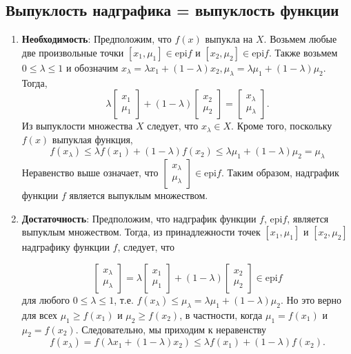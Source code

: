 \documentclass[
  russian,
  letterpaper,
  DIV=11,
  numbers=noendperiod]{scrartcl}
\begin{document}
\subsection{Выпуклость надграфика = выпуклость
функции}\label{ux432ux44bux43fux443ux43aux43bux43eux441ux442ux44c-ux43dux430ux434ux433ux440ux430ux444ux438ux43aux430-ux432ux44bux43fux443ux43aux43bux43eux441ux442ux44c-ux444ux443ux43dux43aux446ux438ux438-1}

\begin{enumerate}
\def\labelenumi{\arabic{enumi}.}
\item
  \textbf{Необходимость}: Предположим, что \(f(x)\) выпукла на \(X\).
  Возьмем любые две произвольные точки \([x_1, \mu_1] \in \text{epi}f\)
  и \([x_2, \mu_2] \in \text{epi}f\). Также возьмем
  \(0 \leq \lambda \leq 1\) и обозначим
  \(x_{\lambda} = \lambda x_1 + (1 - \lambda) x_2, \mu_{\lambda} = \lambda \mu_1 + (1 - \lambda) \mu_2\).
  Тогда, \[
  \lambda\begin{bmatrix}x_1\\ \mu_1\end{bmatrix} + (1 - \lambda)\begin{bmatrix}x_2\\ \mu_2\end{bmatrix} = \begin{bmatrix}x_{\lambda}\\ \mu_{\lambda}\end{bmatrix}.
  \] Из выпуклости множества \(X\) следует, что \(x_{\lambda} \in X\).
  Кроме того, поскольку \(f(x)\) выпуклая функция, \[
  f(x_{\lambda}) \leq \lambda f(x_1) + (1 - \lambda) f(x_2) \leq \lambda \mu_1 + (1 - \lambda) \mu_2 = \mu_{\lambda}
  \] Неравенство выше означает, что
  \(\begin{bmatrix}x_{\lambda}\\ \mu_{\lambda}\end{bmatrix} \in \text{epi}f\).
  Таким образом, надграфик функции \(f\) является выпуклым множеством.
\item
  \textbf{Достаточность}: Предположим, что надграфик функции \(f\),
  \(\text{epi}f\), является выпуклым множеством. Тогда, из
  принадлежности точек \([x_1, \mu_1]\) и \([x_2, \mu_2]\) надграфику
  функции \(f\), следует, что

  \[
  \begin{bmatrix}x_{\lambda}\\ \mu_{\lambda}\end{bmatrix} =  \lambda\begin{bmatrix}x_1\\ \mu_1\end{bmatrix} + (1 - \lambda)\begin{bmatrix}x_2\\ \mu_2\end{bmatrix} \in \text{epi}f
  \] для любого \(0 \leq \lambda \leq 1\), т.е.
  \(f(x_{\lambda}) \leq \mu_{\lambda} = \lambda \mu_1 + (1 - \lambda) \mu_2\).
  Но это верно для всех \(\mu_1 \geq f(x_1)\) и \(\mu_2 \geq f(x_2)\), в
  частности, когда \(\mu_1 = f(x_1)\) и \(\mu_2 = f(x_2)\).
  Следовательно, мы приходим к неравенству \[
  f(x_{\lambda}) = f (\lambda x_1 + (1 - \lambda) x_2) \leq \lambda f(x_1) + (1 - \lambda) f(x_2).
  \]


\end{enumerate}
\end{document}
